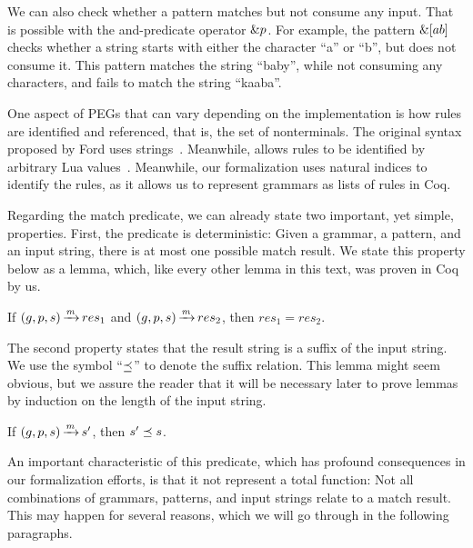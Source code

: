 We can also check whether a pattern matches
but not consume any input.
That is possible with the and-predicate operator $\&p$.
For example,
the pattern $\&[ab]$
checks whether a string
starts with either the character ``a'' or ``b'',
but does not consume it.
This pattern matches the string ``baby'',
while not consuming any characters,
and fails to match the string ``kaaba''.

One aspect of PEGs that can vary
depending on the implementation
is how rules are identified and referenced,
that is, the set of nonterminals.
The original syntax proposed by Ford
uses strings~\cite{ford_parsing_2004}.
Meanwhile,
\lpeg{} allows rules to be identified
by arbitrary Lua values~\cite{ierusalimschy_lpeg_2024}.
Meanwhile, our formalization uses natural indices
to identify the rules,
as it allows us to represent
grammars as lists of rules in Coq.

Regarding the match predicate,
we can already state two important,
yet simple, properties.
First, the predicate is deterministic:
Given a grammar, a pattern, and an input string,
there is at most one possible match result.
We state this property below as a lemma,
which, like every other lemma in this text,
was proven in Coq by us.

\begin{lemma}%
    If ${(g,p,s) \operatorname{\xrightarrow{\mathit{m}}} res_1}$
    and ${(g,p,s) \operatorname{\xrightarrow{\mathit{m}}} res_2}$,
    then ${res_1 = res_2}$.
    \label{lemma:match-determinism}
\end{lemma}

The second property states that the result string
is a suffix of the input string.
We use the symbol ``${\preceq}$''
to denote the suffix relation.
This lemma might seem obvious,
but we assure the reader that it will be necessary later
to prove lemmas by induction on the length of the input string.

\begin{lemma}%
    If ${(g,p,s) \operatorname{\xrightarrow{\mathit{m}}} s'}$,
    then ${s' \preceq s}$.
    \label{lemma:match-suffix}
\end{lemma}

An important characteristic of this predicate,
which has profound consequences in our formalization efforts,
is that it not represent a total function:
Not all combinations of
grammars, patterns, and input strings
relate to a match result.
This may happen for several reasons,
which we will go through
in the following paragraphs.

